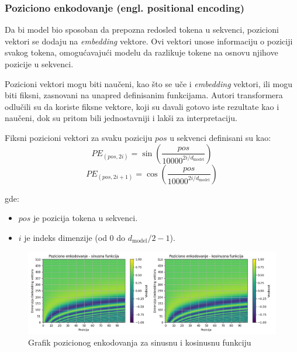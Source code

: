 \documentclass[12pt]{article}
\begin{document}
   \newpage

   \subsubsection*{Poziciono enkodovanje (engl. positional encoding)}
   Da bi model bio sposoban da prepozna redosled tokena u sekvenci, pozicioni vektori 
   se dodaju na \textit{embedding} vektore. Ovi vektori unose informaciju o poziciji 
   svakog tokena, omogućavajući modelu da razlikuje tokene na osnovu njihove pozicije 
   u sekvenci.

   Pozicioni vektori mogu biti naučeni, kao što se uče i \textit{embedding} vektori, ili mogu biti fiksni, 
   zasnovani na unapred definisanim funkcijama. Autori transformera odlučili su da 
   koriste fiksne vektore, koji su davali gotovo iste rezultate kao i naučeni, 
   dok su pritom bili jednostavniji i lakši za interpretaciju.

   Fiksni pozicioni vektori za svaku poziciju \( pos \) u sekvenci definisani su kao:
   \[
      PE_{(pos, 2i)} = \sin\left(\frac{pos}{10000^{2i/d_{\text{model}}}}\right)
   \]
   \vspace{-0.5cm}
   \[
         PE_{(pos, 2i+1)} = \cos\left(\frac{pos}{10000^{2i/d_{\text{model}}}}\right)
   \]
         
   gde:
   \begin{itemize}
      \vspace{-0.5cm}
      \item \( pos \) je pozicija tokena u sekvenci.
      \item \( i \) je indeks dimenzije (od 0 do \( d_{\text{model}}/2 - 1 \)).
   \end{itemize}

   \begin{figure}[h!]
      \hspace{-2cm} %
      \includegraphics[width=1.3\textwidth]{pos_encoding.png}
      \caption{Grafik pozicionog enkodovanja za sinusnu i kosinusnu funkciju}
      \label{fig:pos_encoding}
   \end{figure}
\end{document}
